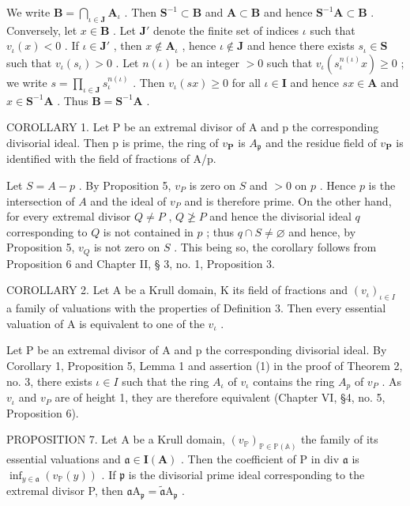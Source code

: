 We write \(\mathbf{B} = \bigcap_{\iota \in \mathbf{J}} \mathbf{A}_{\iota}\) . Then \(\mathbf{S}^{-1} \subset \mathbf{B}\) and \(\mathbf{A} \subset \mathbf{B}\) and hence \(\mathbf{S}^{-1}\mathbf{A} \subset \mathbf{B}\) . Conversely, let \(x \in \mathbf{B}\) . Let \(\mathbf{J}'\) denote the finite set of indices \(\iota\) such that \(v_{\iota}(x) < 0\) . If \(\iota \in \mathbf{J}'\) , then \(x \notin \mathbf{A}_{\iota}\) , hence \(\iota \notin \mathbf{J}\) and hence there exists \(s_{\iota} \in \mathbf{S}\) such that \(v_{\iota}(s_{\iota}) > 0\) . Let \(n(\iota)\) be an integer \(>0\) such that \(v_{\iota}(s_{\iota}^{n(\iota)}x) \geqslant 0\) ; we write \(s = \prod_{\iota \in \mathbf{J}} s_{\iota}^{n(\iota)}\) . Then \(v_{\iota}(sx) \geqslant 0\) for all \(\iota \in \mathbf{I}\) and hence \(sx \in \mathbf{A}\) and \(x \in \mathbf{S}^{-1}\mathbf{A}\) . Thus \(\mathbf{B} = \mathbf{S}^{-1}\mathbf{A}\) .

COROLLARY 1. Let P be an extremal divisor of A and p the corresponding divisorial ideal. Then p is prime, the ring of \(v_{\mathbf{P}}\) is \(A_{\mathfrak{p}}\) and the residue field of \(v_{\mathbf{P}}\) is identified with the field of fractions of A/p.

Let \(S = A - p\) . By Proposition 5, \(v_{P}\) is zero on \(S\) and \(>0\) on \(p\) . Hence \(p\) is the intersection of \(A\) and the ideal of \(v_{P}\) and is therefore prime. On the other hand, for every extremal divisor \(Q \neq P\) , \(Q \not\geq P\) and hence the divisorial ideal \(q\) corresponding to \(Q\) is not contained in \(p\) ; thus \(q \cap S \neq \varnothing\) and hence, by Proposition 5, \(v_{Q}\) is not zero on \(S\) . This being so, the corollary follows from Proposition 6 and Chapter II, § 3, no. 1, Proposition 3.

COROLLARY 2. Let A be a Krull domain, K its field of fractions and \((v_{\iota})_{\iota\in I}\) a family of valuations with the properties of Definition 3. Then every essential valuation of A is equivalent to one of the \(v_{\iota}\) .

Let P be an extremal divisor of A and p the corresponding divisorial ideal. By Corollary 1, Proposition 5, Lemma 1 and assertion (1) in the proof of Theorem 2, no. 3, there exists \(\iota \in I\) such that the ring \(A_{\iota}\) of \(v_{\iota}\) contains the ring \(A_{p}\) of \(v_{P}\) . As \(v_{\iota}\) and \(v_{P}\) are of height 1, they are therefore equivalent (Chapter VI, §4, no. 5, Proposition 6).

PROPOSITION 7. Let A be a Krull domain, \((v_{\mathbb{P}})_{\mathbb{P} \in \mathbb{P}(\mathbb{A})}\) the family of its essential valuations and \(\mathfrak{a} \in \mathbf{I}(\mathbf{A})\) . Then the coefficient of P in div \(\mathfrak{a}\) is \(\inf_{y \in \mathfrak{a}} (v_{\mathbb{P}}(y))\) . If \(\mathfrak{p}\) is the divisorial prime ideal corresponding to the extremal divisor P, then \(\mathfrak{a}\mathrm{A}_{\mathfrak{p}} = \tilde{\mathfrak{a}}\mathrm{A}_{\mathfrak{p}}\) .

